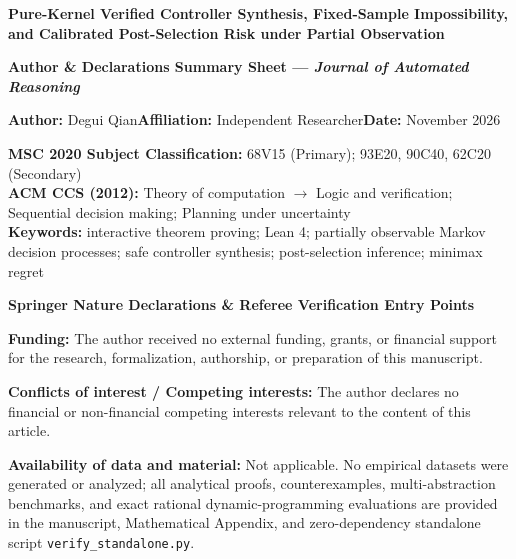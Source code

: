\documentclass[10.2pt,a4paper]{article}
\begin{document}
\pagestyle{empty}
\begin{center}
{\LARGE\bfseries Pure-Kernel Verified Controller Synthesis, Fixed-Sample Impossibility, and Calibrated Post-Selection Risk under Partial Observation\par}
\vspace{8pt}
{\large\bfseries Author \& Declarations Summary Sheet — \emph{Journal of Automated Reasoning}\par}
\end{center}

\vspace{6pt}
\noindent\textbf{Author:} Degui Qian\quad\textbf{Affiliation:} Independent Researcher\quad\textbf{Date:} November 2026

\vspace{5pt}
\noindent\textbf{MSC 2020 Subject Classification:} 68V15 (Primary); 93E20, 90C40, 62C20 (Secondary)\\
\textbf{ACM CCS (2012):} Theory of computation $\to$ Logic and verification; Sequential decision making; Planning under uncertainty\\
\textbf{Keywords:} interactive theorem proving; Lean 4; partially observable Markov decision processes; safe controller synthesis; post-selection inference; minimax regret

\vspace{6pt}
\noindent\textbf{Springer Nature Declarations \& Referee Verification Entry Points}

\vspace{4pt}
\noindent\textbf{Funding:} The author received no external funding, grants, or financial support for the research, formalization, authorship, or preparation of this manuscript.

\vspace{4pt}
\noindent\textbf{Conflicts of interest / Competing interests:} The author declares no financial or non-financial competing interests relevant to the content of this article.

\vspace{4pt}
\noindent\textbf{Availability of data and material:} Not applicable. No empirical datasets were generated or analyzed; all analytical proofs, counterexamples, multi-abstraction benchmarks, and exact rational dynamic-programming evaluations are provided in the manuscript, Mathematical Appendix, and zero-dependency standalone script \texttt{verify\_standalone.py}.
\end{document}

